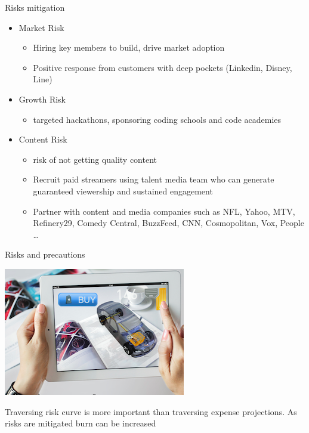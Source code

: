 \documentclass[12pt]{beamer}
\begin{document}
\begin{frame}[fragile]{Risks mitigation}
 \begin{itemize}[<+-| alert@+>]
\item[ ]Market Risk
\begin{itemize}[<+-| alert@+>]
\item Hiring key members to build, drive market adoption
\item Positive response from customers with deep pockets (Linkedin, Disney, Line) 
\end{itemize}

\item[ ]Growth Risk
\begin{itemize}[<+-| alert@+>]
\item targeted hackathons, sponsoring coding schools and code academies
\end{itemize}

\item[ ]Content Risk
\begin{itemize}[<+-| alert@+>]
\item risk of not getting quality content
\item Recruit paid streamers using talent media team who can generate guaranteed viewership and sustained engagement
\item Partner with content and media companies such as NFL, Yahoo, MTV, Refinery29, Comedy Central, BuzzFeed, CNN, Cosmopolitan, Vox, People \ldots
\end{itemize}

\end{itemize}
\end{frame}
\begin{frame}[standout]
 Risks and precautions

\includegraphics[scale=.3]{static/arad/arad5}

 Traversing risk curve is more important than traversing expense projections. As risks are mitigated burn can be increased 
 
\end{frame}
\end{document}
